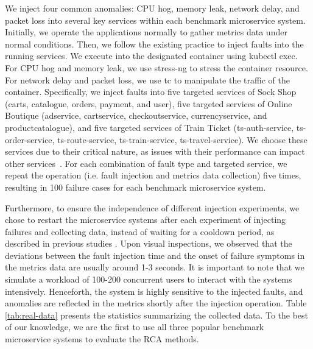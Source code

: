 We inject four common anomalies: CPU hog, memory leak, network delay, and packet loss into several key services within each benchmark microservice system. Initially, we operate the applications normally %
to gather metrics data under normal conditions. Then, we follow the existing practice \cite{Azam2022rcd, lee2023eadro, wu2021microdiag, Xin2023CausalRCA, yu2021microrank} to inject faults into the running services. We execute into the designated container using kubectl exec. For CPU hog and memory leak, we use stress-ng \cite{stressng} to stress the container resource. For network delay and packet loss, we use tc \cite{tc} to manipulate the traffic of the container. Specifically, we inject faults into five targeted services of Sock Shop (carts, catalogue, orders, payment, and user), five targeted services of Online Boutique (adservice, cartservice, checkoutservice, currencyservice, and productcatalogue), and five targeted services of Train Ticket (ts-auth-service, ts-order-service, ts-route-service, ts-train-service, ts-travel-service). We choose these services due to their critical nature, as issues with their performance can impact other services~\cite{Azam2022rcd, Xin2023CausalRCA, lee2023eadro}. For each combination of fault type and targeted service, we repeat the operation (i.e. fault injection and metrics data collection) five times, resulting in 100 failure cases for each benchmark microservice system. 

Furthermore, to ensure the independence of different injection experiments, we chose to restart the microservice systems after each experiment of injecting failures and collecting data, instead of waiting for a cooldown period, as described in previous studies \cite{wu2021microdiag, yu2021microrank, Xin2023CausalRCA}. Upon visual inspections, we observed that the deviations between the fault injection time and the onset of failure symptoms in the metrics data are usually around 1-3 seconds. 
It is important to note that we simulate a workload of 100-200 concurrent users to interact with the systems intensively. Henceforth, the system is highly sensitive to the injected faults, and anomalies are reflected in the metrics shortly after the injection operation. Table \ref{tab:real-data} presents the statistics summarizing the collected data. To the best of our knowledge, we are the first to use all three popular benchmark microservice systems to evaluate the RCA methods. 


